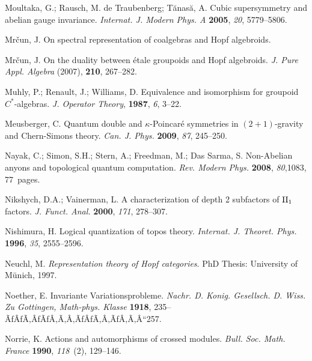 \documentclass[12pt]{article}
\theoremstyle{plain}
\theoremstyle{definition}
\numberwithin{equation}{section}
\begin{document}
\begin{thebibliography}{199}
Moultaka, G.; Rausch, M. de Traubenberg; T\u{a}nas\u{a}, A.  Cubic supersymmetry and abelian gauge invariance.
 {\em Internat. J. Modern Phys. A} {\bf 2005}, {\em 20}, 5779--5806. %

Mr\v{c}un, J.  On spectral representation of coalgebras and Hopf algebroids. %


Mr\v{c}un, J.  On the duality between \'{e}tale groupoids and Hopf algebroids. \emph{J. Pure Appl. Algebra} (2007), {\bf 210}, 267--282.

Muhly, P.; Renault, J.; Williams, D. Equivalence and isomorphism for groupoid $C^*$-algebras. {\em J. Operator Theory}, {\bf 1987}, {\em 6}, 3--22.

Meusberger, C.  Quantum double and $\kappa$-Poincar\'{e} symmetries in $(2+1)$-gravity and Chern-Simons theory. {\em Can. J. Phys.} \textbf{2009}, {\em 87}, 245--250.

Nayak, C.; Simon, S.H.; Stern, A.; Freedman, M.; Das Sarma, S.  Non-Abelian anyons and topological quantum computation. {\it Rev. Modern Phys.} {\bf 2008}, {\em 80},1083, 77~pages. 

Nikshych, D.A.; Vainerman, L.  A characterization of depth 2 subfactors of ${\rm II}_1$ factors. {\em J. Funct. Anal.} {\bf 2000}, {\em 171}, 278--307. %

Nishimura, H. Logical quantization of topos theory. {\em Internat. J. Theoret. Phys.} {\bf 1996}, {\em 35}, 2555--2596.

Neuchl, M. {\em Representation theory of Hopf categories}. PhD Thesis: University of M\"unich, 1997.

Noether, E. Invariante Variationsprobleme. {\em Nachr. D. Konig. Gesellsch. D. Wiss. Zu Gottingen, Math-phys. Klasse} {\bf 1918}, 235--ÃƒÂƒÃ‚ÂƒÃƒÂ‚Ã‚Â‚ÃƒÂƒÃ‚Â‚ÃƒÂ‚Ã‚Â“257.

Norrie, K. Actions and automorphisms of crossed modules. {\em Bull. Soc. Math. France} {\bf 1990}, {\em 118}~(2), 129--146.


\end{thebibliography}
\end{document}
